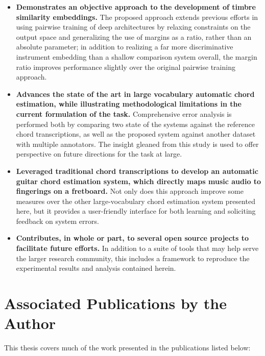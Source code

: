 \begin{itemize}
  \onehalfspacing
\item \textbf{Demonstrates an objective approach to the development of timbre similarity embeddings.} The proposed approach extends previous efforts in using pairwise training of deep architectures by relaxing constraints on the output space and generalizing the use of margins as a ratio, rather than an absolute parameter; in addition to realizing a far more discriminative instrument embedding than a shallow comparison system overall, the margin ratio improves performance slightly over the original pairwise training approach.
\item \textbf{Advances the state of the art in large vocabulary automatic chord estimation, while illustrating methodological limitations in the current formulation of the task.} Comprehensive error analysis is performed both by comparing two state of the systems against the reference chord transcriptions, as well as the proposed system against another dataset with multiple annotators. The insight gleaned from this study is used to offer perspective on future directions for the task at large.
\item \textbf{Leveraged traditional chord transcriptions to develop an automatic guitar chord estimation system, which directly maps music audio to fingerings on a fretboard.} Not only does this approach improve some measures over the other large-vocabulary chord estimation system presented here, but it provides a user-friendly interface for both learning and soliciting feedback on system errors.
\item \textbf{Contributes, in whole or part, to several open source projects to facilitate future efforts.} In addition to a suite of tools that may help serve the larger research community, this includes a framework to reproduce the experimental results and analysis contained herein.
\end{itemize}


\section{Associated Publications by the Author}

This thesis covers much of the work presented in the publications listed below:


